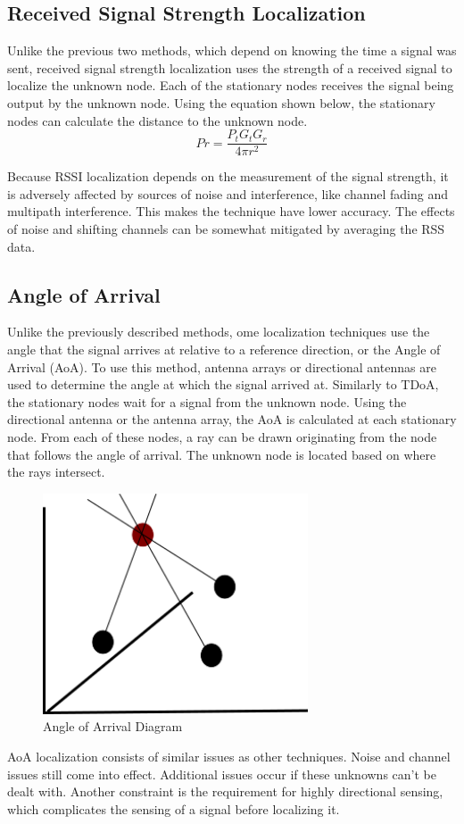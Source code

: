 \subsection{Received Signal Strength Localization}
Unlike the previous two methods, which depend on knowing the time a signal was sent, received signal strength localization uses the strength of a received signal to localize the unknown node. Each of the stationary nodes receives the signal being output by the unknown node. Using the equation shown below, the stationary nodes can calculate the distance to the unknown node.
\[Pr = \frac{P_t G_t G_r}{4πr^2} \]\par
Because RSSI localization depends on the measurement of the signal strength, it is adversely affected by sources of noise and interference, like channel fading and multipath interference. This makes the technique have lower accuracy. The effects of noise and shifting channels can be somewhat mitigated by averaging the RSS data.

\subsection{Angle of Arrival}
Unlike the previously described methods, ome localization techniques use the angle that the signal arrives at relative to a reference direction, or the Angle of Arrival (AoA)\cite{local_aoa}. To use this method, antenna arrays or directional antennas are used to determine the angle at which the signal arrived at. Similarly to TDoA, the stationary nodes wait for a signal from the unknown node. Using the directional antenna or the antenna array, the AoA is calculated at each stationary node. From each of these nodes, a ray can be drawn originating from the node that follows the angle of arrival. The unknown node is located based on where the rays intersect.
\begin{figure}[ht]
\centering
\includegraphics[width=0.70\textwidth]{img/path4188.png}
\caption{Angle of Arrival Diagram}
\label{fig:aoa_diagram}
\end{figure}\par
AoA localization consists of similar issues as other techniques. Noise and channel issues still come into effect. Additional issues occur if these unknowns can’t be dealt with. Another constraint is the requirement for highly directional sensing, which complicates the sensing of a signal before localizing it.


